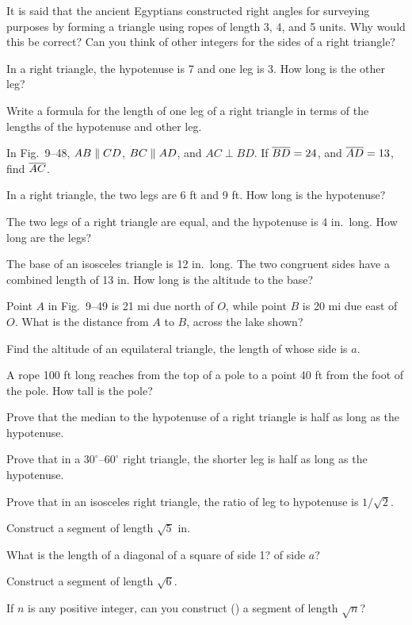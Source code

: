 \documentclass[11pt]{book}
\begin{document}
\begin{exercisecols}
\begin{exlist}
\item It is said that the ancient Egyptians constructed right angles for
      surveying purposes by forming a triangle using ropes of length 3, 4, and 5
      units. Why would this be correct? Can you think of other integers for the
      sides of a right triangle?
\item In a right triangle, the hypotenuse is 7 and one leg is 3. How long is the
      other leg?
\item Write a formula for the length of one leg of a right triangle in terms of
      the lengths of the hypotenuse and other leg.
\item[\stex 4.] In Fig.~9--48, $AB \mathrel{\|} CD$, $BC \mathrel{\|} AD$, and $AC \perp BD$. If
      $\overline{BD} = 24$, and $\overline{AD} = 13$, find $\overline{AC}$.
\exfig{\FIGIXFORTYEIGHT}
\item[5.] In a right triangle, the two legs are 6 ft and 9 ft. How long is the
      hypotenuse?
\item The two legs of a right triangle are equal, and the hypotenuse is 4 in.\
      long. How long are the legs?
\item The base of an isosceles triangle is 12 in.\ long. The two congruent sides
      have a combined length of 13 in. How long is the altitude to the base?
\item Point $A$ in Fig.~9--49 is 21 mi due north of $O$, while point $B$ is 20 mi
      due east of $O$. What is the distance from $A$ to $B$, across the lake
      shown?
\exfig{\FIGIXFORTYNINE}
\item Find the altitude of an equilateral triangle, the length of whose side is
      $a$.
\item A rope 100 ft long reaches from the top of a pole to a point 40 ft from the
      foot of the pole. How tall is the pole?
\item Prove that the median to the hypotenuse of a right triangle is half as long
      as the hypotenuse.
\item Prove that in a $30^\circ$--$60^\circ$ right triangle, the shorter leg is
      half as long as the hypotenuse.
\item Prove that in an isosceles right triangle, the ratio of leg to hypotenuse
      is $1/\sqrt{2}$.
\item Construct a segment of length $\sqrt{5}$ in.
\item What is the length of a diagonal of a square of side 1? of side $a$?
\item Construct a segment of length $\sqrt{6}$.
\item[\stex 17.] If $n$ is any positive integer, can you construct (\RC) a
      segment of length $\sqrt{n}$?
\end{exlist}
\end{exercisecols}
\end{document}
